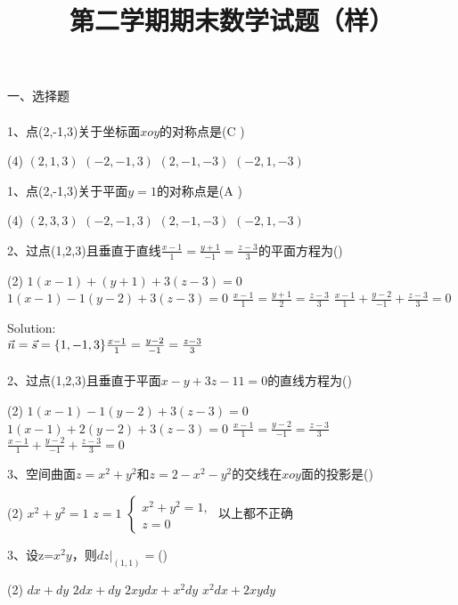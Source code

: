 \documentclass[12pt,a3paper]{article}
\title{第二学期期末数学试题（样）}
\date{}
\begin{document}
\maketitle


一、选择题
\\\\
1、点(2,-1,3)关于坐标面$xoy$的对称点是\hfill(\quad C \quad)
\begin{tasks}(4)
    \task $(2,1,3)$
    \task $(-2,-1,3)$
    \task $(2,-1,-3)$
    \task $(-2,1,-3)$
    \\
\end{tasks}
1、点(2,-1,3)关于平面$y=1$的对称点是\hfill(\quad A \quad)
\begin{tasks}(4)
    \task $(2,3,3)$
    \task $(-2,-1,3)$
    \task $(2,-1,-3)$
    \task $(-2,1,-3)$
    \\
\end{tasks}
2、过点(1,2,3)且垂直于直线$\frac{x-1}{1}=\frac{y+1}{-1}=\frac{z-3}{3}$的平面方程为\hfill(\qquad)
\begin{tasks}(2)
    \task $1(x-1)+(y+1)+3(z-3)=0$
    \task $1(x-1)-1(y-2)+3(z-3)=0$
    \task $\frac{x-1}{1}=\frac{y+1}{2}=\frac{z-3}{3}$
    \task $\frac{x-1}{1}+\frac{y-2}{-1}+\frac{z-3}{3}=0$
    \\
\end{tasks}
Solution:
\\
$\vec{n}=\vec{s}=\{1,-1,3\}
\\
\frac{x-1}{1}=\frac{y-2}{-1}=\frac{z-3}{3}$
\\\\
2、过点(1,2,3)且垂直于平面$x-y+3z-11=0$的直线方程为\hfill(\qquad)
\begin{tasks}(2)
    \task $1(x-1)-1(y-2)+3(z-3)=0$
    \task $1(x-1)+2(y-2)+3(z-3)=0$
    \task $\frac{x-1}{1}=\frac{y-2}{-1}=\frac{z-3}{3}$
    \\
    \task $\frac{x-1}{1}+\frac{y-2}{-1}+\frac{z-3}{3}=0$
\end{tasks}
3、空间曲面$z=x^2+y^2$和$z=2-x^2-y^2$的交线在$xoy$面的投影是\hfill(\qquad)
\begin{tasks}(2)
    \task $x^2+y^2=1$
    \task $z=1$
    \task $
    \begin{cases}
        x^2+y^2=1,\\
        z=0
    \end{cases}$
    \task 以上都不正确
    \\
\end{tasks}
3、设z=$x^2y$，则$dz|_{(1,1)}=$\hfill(\qquad)
\begin{tasks}(2)
    \task $dx+dy$
    \task $2dx+dy$
    \task $2xydx+x^2dy$
    \task $x^2dx+2xydy$
    \\
\end{tasks}
\end{document}
